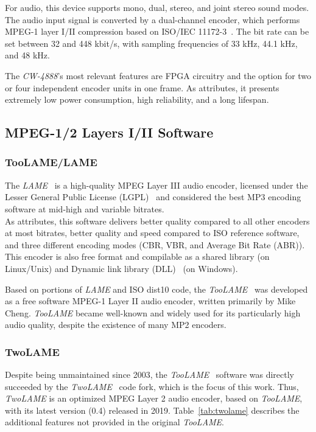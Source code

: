 For audio, this device supports mono, dual, stereo, and joint stereo sound modes. The audio input signal is converted by a dual-channel encoder, which performs MPEG-1 layer I/II compression based on ISO/IEC 11172-3~\cite{11172}. 
The bit rate can be set between 32 and 448 kbit/s, with sampling frequencies of 33 kHz, 44.1 kHz, and 48 kHz.

The \textit{CW-4888}'s most relevant features are FPGA circuitry and the option for two or four independent encoder units in one frame.
As attributes, it presents extremely low power consumption, high reliability, and a long lifespan.

\subsection{MPEG-1/2 Layers I/II Software}

\subsubsection{TooLAME/LAME}

The \textit{LAME}~\cite{lame} is a high-quality MPEG Layer III audio encoder, licensed under the Lesser General Public License (LGPL)~\cite{lgpl} and considered the best MP3 encoding software at mid-high and variable bitrates.\\
As attributes, this software delivers better quality compared to all other encoders at most bitrates, better quality and speed compared to ISO reference software, and three different encoding modes (CBR, VBR, and Average Bit Rate (ABR)). This encoder is also free format and compilable as a shared library (on Linux/Unix) and Dynamic link library (DLL)~\cite{dll} (on Windows).

Based on portions of \textit{LAME} and ISO dist10 code, the \textit{TooLAME}~\cite{toolame} was developed as a free software MPEG-1 Layer II audio encoder, written primarily by Mike Cheng. \textit{TooLAME} became well-known and widely used for its particularly high audio quality, despite the existence of many MP2 encoders.

\subsubsection{TwoLAME}

Despite being unmaintained since 2003, the \textit{TooLAME}~\cite{toolame} software was directly succeeded by the \textit{TwoLAME}~\cite{twolame} code fork, which is the focus of this work.
Thus, \textit{TwoLAME} is an optimized MPEG Layer 2 audio encoder, based on \textit{TooLAME}, with its latest version (0.4) released in 2019. 
Table~\ref{tab:twolame} describes the additional features not provided in the original \textit{TooLAME}.

